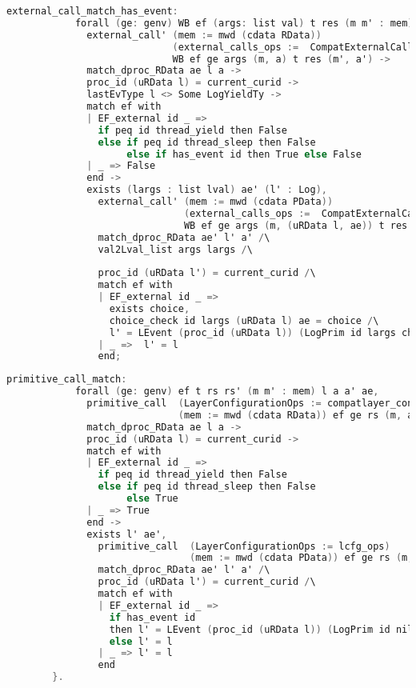\begin{lstlisting}[language=C]
          external_call_match_has_event:
            forall (ge: genv) WB ef (args: list val) t res (m m' : mem) (a a': RData) ae l,
              external_call' (mem := mwd (cdata RData)) 
                             (external_calls_ops :=  CompatExternalCalls.compatlayer_extcall_ops (phthread <@$\oplus$@>  L64))
                             WB ef ge args (m, a) t res (m', a') ->
              match_dproc_RData ae l a ->
              proc_id (uRData l) = current_curid ->
              lastEvType l <> Some LogYieldTy ->
              match ef with
              | EF_external id _ => 
                if peq id thread_yield then False
                else if peq id thread_sleep then False
                     else if has_event id then True else False
              | _ => False
              end -> 
              exists (largs : list lval) ae' (l' : Log),
                external_call' (mem := mwd (cdata PData)) 
                               (external_calls_ops :=  CompatExternalCalls.compatlayer_extcall_ops (LH <@$\oplus$@>  L64))
                               WB ef ge args (m, (uRData l, ae)) t res (m', (uRData l', ae')) /\
                match_dproc_RData ae' l' a' /\
                val2Lval_list args largs /\
                
                proc_id (uRData l') = current_curid /\
                match ef with 
                | EF_external id _ =>
                  exists choice,
                  choice_check id largs (uRData l) ae = choice /\
                  l' = LEvent (proc_id (uRData l)) (LogPrim id largs choice (snap_func ae)) :: l
                | _ =>  l' = l
                end;
\end{lstlisting}

\begin{lstlisting}[language=C]
          primitive_call_match:
            forall (ge: genv) ef t rs rs' (m m' : mem) l a a' ae,
              primitive_call  (LayerConfigurationOps := compatlayer_configuration_ops (phthread <@$\oplus$@> L64))
                              (mem := mwd (cdata RData)) ef ge rs (m, a) t rs' (m', a') ->
              match_dproc_RData ae l a ->
              proc_id (uRData l) = current_curid ->
              match ef with
              | EF_external id _ => 
                if peq id thread_yield then False
                else if peq id thread_sleep then False
                     else True
              | _ => True
              end -> 
              exists l' ae',
                primitive_call  (LayerConfigurationOps := lcfg_ops) 
                                (mem := mwd (cdata PData)) ef ge rs (m, (uRData l, ae)) t rs' (m', (uRData l', ae')) /\
                match_dproc_RData ae' l' a' /\
                proc_id (uRData l') = current_curid /\
                match ef with
                | EF_external id _ => 
                  if has_event id
                  then l' = LEvent (proc_id (uRData l)) (LogPrim id nil 0 (snap_func ae)) :: l
                  else l' = l
                | _ => l' = l
                end
        }.
\end{lstlisting}

